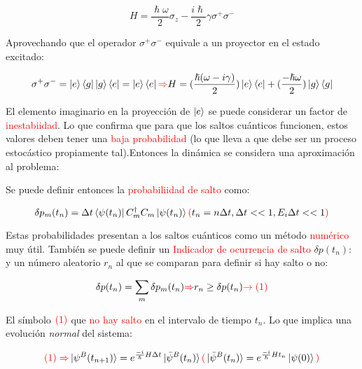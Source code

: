\documentclass{book}
\begin{document}
\begin{equation}\label{eq4.2}H=\frac{\hslash\omega}{2}\sigma_z-\frac{i\hslash}{2}\gamma \sigma^+\sigma^-\end{equation}

Aprovechando que el operador $\sigma^+\sigma^-$ equivale a un proyector en el estado excitado:

\begin{equation}\label{eq4.3}\sigma^+\sigma^-=\ket{e}\bra{g}\ket{g}\bra{e}=\ket{e}\bra{e}\textcolor{red}{\Rightarrow} H= (\frac{\hslash(\omega-i\gamma)}{2})\ket{e}\bra{e}+(\frac{-\hslash\omega}{2})\ket{g}\bra{g}\end{equation}

El elemento imaginario en la proyección de $\ket{e}$ se puede considerar un factor de \textcolor{red}{inestabiidad}. Lo que confirma que para que los saltos cuánticos funcionen, estos valores deben tener una \textcolor{red}{baja probabilidad} (lo que lleva a que debe ser un proceso estocástico propiamente tal).Entonces la dinámica se considera una aproximación al problema:

Se puede definir entonces la \textcolor{red}{probabiliidad de salto} como:

\begin{equation}\label{eq4.4}\delta p_m(t_n)=\Delta t \bra{\psi(t_n)}C_m^\dag C_m\ket{\psi(t_n)}\textcolor{red}{(}t_n=n\Delta t,  \Delta t << 1, E_i \Delta t <<1 \textcolor{red}{)}\end{equation}

Estas probabilidades presentan a los saltos cuánticos como un método \textcolor{red}{numérico} muy útil. También se puede definir un \textcolor{red}{Indicador de ocurrencia de salto} $\delta p(t_n)$: y un número aleatorio $r_n$ al que se comparan para definir si hay salto o no:

\begin{equation}\label{eq4.5}\delta p(t_n)=\sum_m \delta p_m(t_n) \textcolor{red}{\Rightarrow} r_n \geq \delta p(t_n) \textcolor{red}{\rightarrow (1)} \end{equation}

El símbolo $\textcolor{red}{(1)}$ que \textcolor{red}{no hay salto} en el intervalo de tiempo $t_n$. Lo que implica una evolución \textit{normal} del sistema:

\begin{equation}\label{eq4.6} \textcolor{red}{(1)\Rightarrow} \ket{\psi^B(t_{n+1})}=e^{\frac{-i}{\hslash}H\Delta t}\ket{\bar{\psi}^B(t_n)}\textcolor{red}{(}\ket{\bar{\psi}^B(t_n)}=e^{\frac{-i}{\hslash}Ht_n}\ket{\psi(0)}\textcolor{red}{)}\end{equation}
\end{document}
